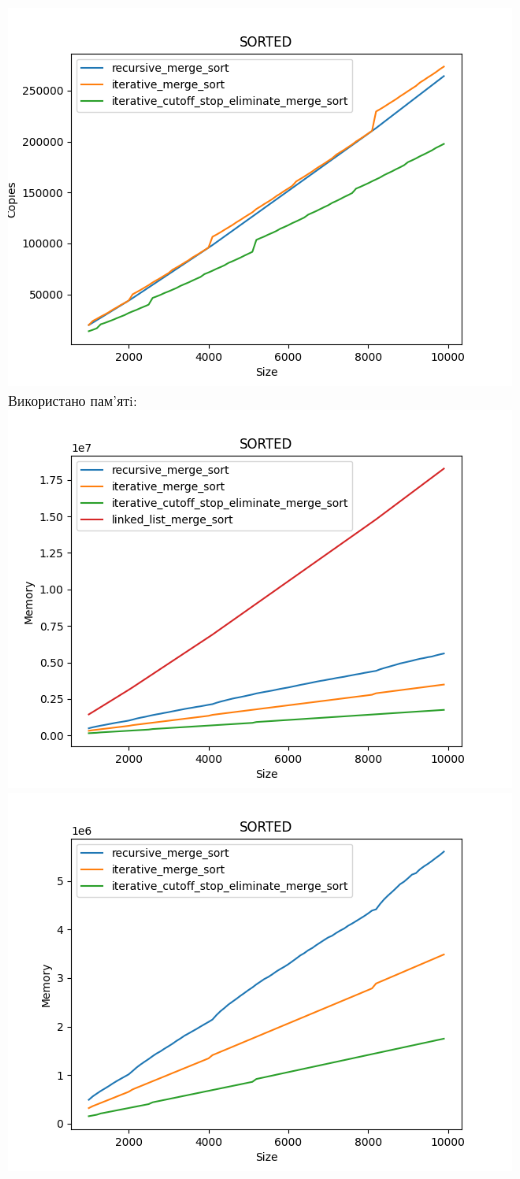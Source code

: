 \documentclass{article}
\begin{document}
            \includegraphics[scale=0.5]{sorted_Copies_3_sorts_90_numbers_50.png}
        \newline
        Використано пам’ятi:
        \newline
            \includegraphics[scale=0.5]{sorted_Memory_4_sorts_90_numbers_50.png}
            \includegraphics[scale=0.5]{sorted_Memory_3_sorts_90_numbers_50.png}
\end{document}
